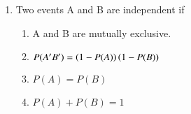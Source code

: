 \renewcommand{\theequation}{\theenumi}
\begin{enumerate}[label=\thesection.\arabic*.,ref=\thesection.\theenumi]
\item Two events A and B are independent if 
\begin{enumerate}
\item A and B are mutually exclusive.
\item $P(A'B')= \left(1-P(A)\right)\left(1-P(B)\right)$
\item $P(A)=P(B)$
\item $P(A)+P(B)=1$
\end{enumerate}
\end{enumerate}